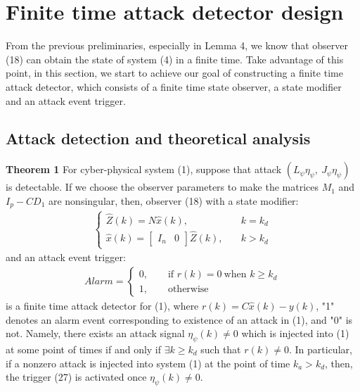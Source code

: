 \documentclass[english]{cccconf}
\theoremstyle{definition}
\begin{document}
\section{Finite time attack detector design}

From the previous preliminaries, especially in Lemma 4, we know that observer (18) can obtain the state of system (4) in a finite time. Take advantage of this point,  
in this section, we start to achieve our goal of constructing a finite time attack detector, which consists of a finite time state observer, a state modifier and an attack event trigger. %
\subsection{Attack detection and theoretical analysis}
\textbf{Theorem 1} For cyber-physical system (1), suppose that attack $(L_{\psi}\eta_\psi,\ J_{\psi}\eta_\psi)$ is detectable. If we choose the observer parameters to make the matrices $M_1$ and $I_p-CD_1$ are nonsingular, then, observer (18) with a state modifier:
\begin{equation}\begin{split}\begin{cases}
\hat{Z}(k)=N\hat{x}(k),\quad &k=k_d\\
\hat{x}(k)=\begin{bmatrix}
I_n&0
\end{bmatrix}\hat{Z}(k),\quad &k> k_d
\end{cases}\end{split}\end{equation}
and an attack event trigger:
\begin{equation}\begin{split}
Alarm=\begin{cases}
0,\qquad \text{if } r(k)=0\  \text{when } k\geq k_d\\
1,\qquad \text{otherwise } 
\end{cases}\end{split}\end{equation}
is a finite time attack detector for (1), where $r(k)=C\hat{x}(k)-y(k)$, "1" denotes an alarm event corresponding to existence of an attack in (1), and "0" is not. Namely, there exists an attack signal $\eta_\psi(k)\neq 0$ which is injected into (1) at some point of times if and only if $\exists k\geq k_d$ such that $r(k)\neq 0$. In particular, if a nonzero attack is injected into system (1) at the point of time $k_a>k_d$, then, the trigger (27) is activated once $\eta_\psi(k)\neq 0$.
\end{document}
